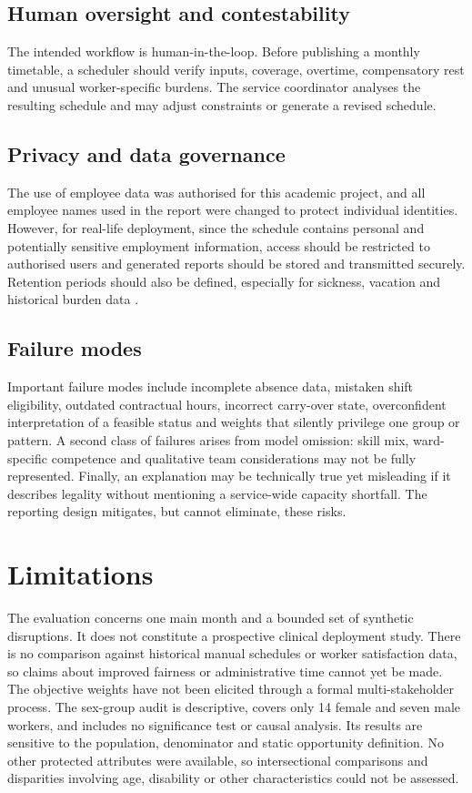 \documentclass[11pt,a4paper]{article}
\begin{document}
\subsection{Human oversight and contestability}

The intended workflow is human-in-the-loop. Before publishing a monthly timetable, a scheduler should verify inputs, coverage, overtime, compensatory rest and unusual worker-specific burdens. The service coordinator analyses the resulting schedule and may adjust constraints or generate a revised schedule.

\subsection{Privacy and data governance}

The use of employee data was authorised for this academic project, and all employee names used in the report were changed to protect individual identities. However, for real-life deployment, since the schedule contains personal and potentially sensitive employment information, access should be restricted to authorised users and generated reports should be stored and transmitted securely. Retention periods should also be defined, especially for sickness, vacation and historical burden data \cite{gdpr}.

\subsection{Failure modes}

Important failure modes include incomplete absence data, mistaken shift eligibility, outdated contractual hours, incorrect carry-over state, overconfident interpretation of a feasible status and weights that silently privilege one group or pattern. A second class of failures arises from model omission: skill mix, ward-specific competence and qualitative team considerations may not be fully represented. Finally, an explanation may be technically true yet misleading if it describes legality without mentioning a service-wide capacity shortfall. The reporting design mitigates, but cannot eliminate, these risks.

\section{Limitations}

The evaluation concerns one main month and a bounded set of synthetic disruptions. It does not constitute a prospective clinical deployment study. There is no comparison against historical manual schedules or worker satisfaction data, so claims about improved fairness or administrative time cannot yet be made. The objective weights have not been elicited through a formal multi-stakeholder process. The sex-group audit is descriptive, covers only 14 female and seven male workers, and includes no significance test or causal analysis. Its results are sensitive to the population, denominator and static opportunity definition. No other protected attributes were available, so intersectional comparisons and disparities involving age, disability or other characteristics could not be assessed.
\end{document}
